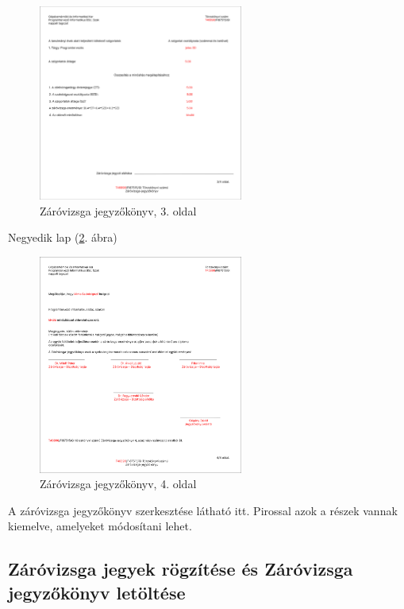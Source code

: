 \documentclass[a4paper,12pt]{article}
\begin{document}
\begin{figure}[h!]
	\centering
	\includegraphics[width=0.6\textwidth]{images/Web_pages/Zv_Report3.png}
	\caption{Záróvizsga jegyzőkönyv, 3. oldal}
	\label{fig:Zv_Report3}
\end{figure}

Negyedik lap (\ref{fig:Zv_Report4}. ábra)

\begin{figure}[h!]
	\centering
	\includegraphics[width=0.6\textwidth]{images/Web_pages/Zv_Report4.png}
	\caption{Záróvizsga jegyzőkönyv, 4. oldal}
	\label{fig:Zv_Report4}
\end{figure}

A záróvizsga jegyzőkönyv szerkesztése látható itt. Pirossal azok a részek vannak kiemelve, amelyeket módosítani lehet.

\subsection{Záróvizsga jegyek rögzítése és Záróvizsga jegyzőkönyv letöltése}
\end{document}
